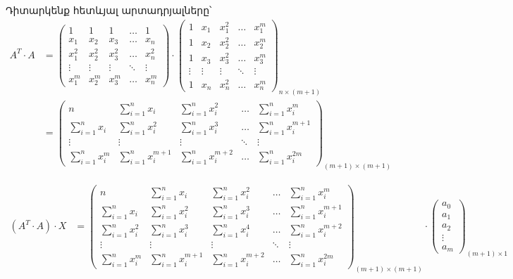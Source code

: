 \documentclass[12pt,a4paper]{article}
\numberwithin{equation}{section}
\numberwithin{figure}{section}
\begin{document}
Դիտարկենք հետևյալ արտադրյալները՝
\begin{align*}
A^T \cdot A &=
\begin{pmatrix}
1 & 1 & 1 & \dots & 1 \\
x_1 & x_2 & x_3 & \dots & x_n \\
x_1^2 & x_2^2 & x_3^2 & \dots & x_n^2 \\
\vdots & \vdots & \vdots & \ddots & \vdots \\
x_1^m & x_2^m & x_3^m & \dots & x_n^m
\end{pmatrix}
\cdot
\begin{pmatrix}
1 & x_1 & x_1^2 & \dots & x_1^m \\
1 & x_2 & x_2^2 & \dots & x_2^m \\
1 & x_3 & x_3^2 & \dots & x_3^m \\
\vdots & \vdots & \vdots & \ddots & \vdots \\
1 & x_n & x_n^2 & \dots & x_n^m
\end{pmatrix}_{n \times (m+1)} \\[12pt]
&=
\begin{pmatrix}
n & \displaystyle\sum_{i=1}^n x_i & \displaystyle\sum_{i=1}^n x_i^2 & \dots & \displaystyle\sum_{i=1}^n x_i^m \\[14pt]
\displaystyle\sum_{i=1}^n x_i & \displaystyle\sum_{i=1}^n x_i^2 & \displaystyle\sum_{i=1}^n x_i^3 & \dots & \displaystyle\sum_{i=1}^n x_i^{m+1} \\[12pt]
\vdots & \vdots & \vdots & \ddots & \vdots \\[8pt]
\displaystyle\sum_{i=1}^n x_i^m & \displaystyle\sum_{i=1}^n x_i^{m+1} & \displaystyle\sum_{i=1}^n x_i^{m+2} & \dots & \displaystyle\sum_{i=1}^n x_i^{2m}
\end{pmatrix}_{(m+1) \times (m+1)}
\end{align*}

\begin{align}
(A^T \cdot A) \cdot X &=
\begin{pmatrix}
n & \sum_{i=1}^n x_i & \sum_{i=1}^n x_i^2 & \dots & \sum_{i=1}^n x_i^m \\[6pt]
\sum_{i=1}^n x_i & \sum_{i=1}^n x_i^2 & \sum_{i=1}^n x_i^3 & \dots & \sum_{i=1}^n x_i^{m+1} \\[6pt]
\sum_{i=1}^n x_i^2 & \sum_{i=1}^n x_i^3 & \sum_{i=1}^n x_i^4 & \dots & \sum_{i=1}^n x_i^{m+2} \\[4pt]
\vdots & \vdots & \vdots & \ddots & \vdots \\[4pt]
\sum_{i=1}^n x_i^m & \sum_{i=1}^n x_i^{m+1} & \sum_{i=1}^n x_i^{m+2} & \dots & \sum_{i=1}^n x_i^{2m}
\end{pmatrix}_{(m+1) \times (m+1)}
\cdot
\begin{pmatrix}
a_0 \\
a_1 \\
a_2 \\
\vdots \\
a_m
\end{pmatrix}_{(m+1) \times 1} \nonumber \\[12pt]
\end{align}
\end{document}
